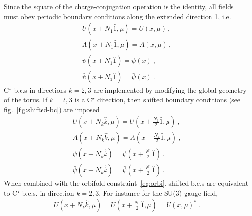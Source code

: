 \documentclass[11pt,fleqn]{article}
\begin{document}
Since the square of the charge-conjugation operation is the identity, all fields must obey periodic boundary conditions along the extended direction 1, i.e.
\begin{subequations}
   \label{eq:periodic}
   \begin{gather}
      U(x+N_1 \hat{1},\mu) = U(x,\mu) \ ,
      \label{eq:periodic:SU3} \\
      A(x+N_1 \hat{1},\mu) = A(x,\mu) \ ,
      \label{eq:periodic:U1} \\
      \psi(x+N_1 \hat{1}) = \psi(x) \ ,
      \label{eq:periodic:psi} \\
      \bar{\psi}(x+N_1 \hat{1}) = \bar{\psi}(x) \ .
      \label{eq:periodic:psibar}
   \end{gather}
\end{subequations}
C$^\star$ b.c.s in directions $k=2,3$ are implemented by modifying the global geometry of the torus. If $k=2,3$ is a C$^\star$ direction, then shifted boundary conditions (see fig.~\ref{fig:shifted-bc}) are imposed
\begin{subequations}
   \label{eq:shifted}
   \begin{gather}
      U(x + N_k \hat{k},\mu) = U(x+\tfrac{N_1}{2} \hat{1},\mu) \ ,
      \label{eq:shifted:SU3} \\
      A(x + N_k \hat{k},\mu) = A(x+\tfrac{N_1}{2} \hat{1},\mu) \ ,
      \label{eq:shifted:U1} \\
      \psi(x + N_k \hat{k}) = \psi(x+\tfrac{N_1}{2} \hat{1}) \ ,
      \label{eq:shifted:psi} \\
      \bar{\psi}(x + N_k \hat{k}) = \bar{\psi}(x+\tfrac{N_1}{2} \hat{1}) \ .
      \label{eq:shifted:bar}
   \end{gather}
\end{subequations}
When combined with the orbifold constraint~\eqref{eq:orbi}, shifted b.c.s are equivalent to C$^\star$ b.c.s. in direction $k=2,3$. For instance for the SU(3) gauge field,
\begin{gather}
   U(x + N_k \hat{k},\mu) = U(x+\tfrac{N_1}{2} \hat{1},\mu) = U(x,\mu)^* \ .
\end{gather}
\end{document}
